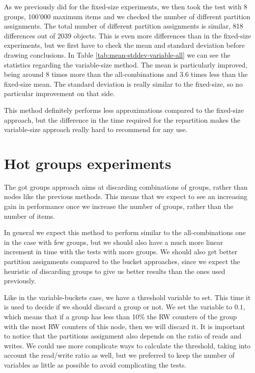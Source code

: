 As we previously did for the fixed-size experiments, we then took the test with 8 groups, 100'000 maximum items and we checked the number of different partition assignments. The total number of different partition assignments is similar, 818 differences out of 2039 objects. This is even more differences than in the fixed-size experiments, but we first have to check the mean and standard deviation before drawing conclusions. In Table \ref{tab:mean-stddev-variable-all} we can see the statistics regarding the variable-size method. The mean is particularly improved, being around 8 times more than the all-combinations and 3.6 times less than the fixed-size mean. The standard deviation is really similar to the fixed-size, so no particular improvement on that side.

This method definitely performs less approximations compared to the fixed-size approach, but the difference in the time required for the repartition makes the variable-size approach really hard to recommend for any use.

\section{Hot groups experiments}\label{sec:hot-groups-experiments}
The got groups approach aims at discarding combinations of groups, rather than nodes like the previous methods. This means that we expect to see an increasing gain in performance once we increase the number of groups, rather than the number of items.

In general we expect this method to perform similar to the all-combinations one in the case with few groups, but we should also have a much more linear increment in time with the tests with more groups. We should also get better partition assignments compared to the bucket approaches, since we expect the heuristic of discarding groups to give us better results than the ones used previously.

Like in the variable-buckets case, we have a threshold variable to set. This time it is used to decide if we should discard a group or not. We set the variable to $0.1$, which means that if a group has less than 10\% the RW counters of the group with the most RW counters of this node, then we will discard it. It is important to notice that the partitions assignment also depends on the ratio of reads and writes. We could use more complicate ways to calculate the threshold, taking into account the read/write ratio as well, but we preferred to keep the number of variables as little as possible to avoid complicating the tests.

